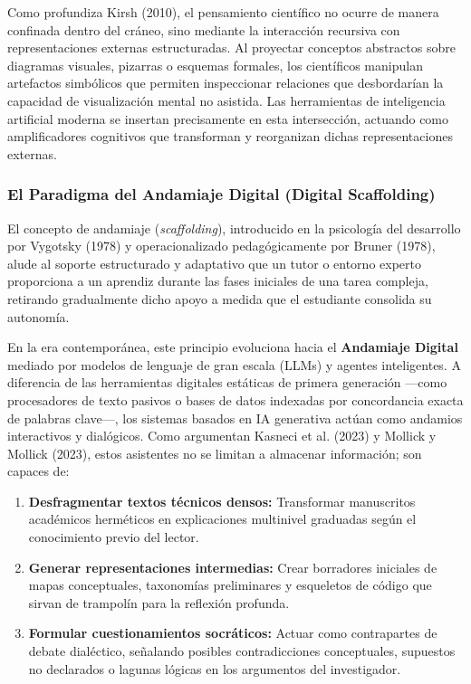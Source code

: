 Como profundiza Kirsh (2010), el pensamiento científico no ocurre de manera confinada dentro del cráneo, sino mediante la interacción recursiva con representaciones externas estructuradas. Al proyectar conceptos abstractos sobre diagramas visuales, pizarras o esquemas formales, los científicos manipulan artefactos simbólicos que permiten inspeccionar relaciones que desbordarían la capacidad de visualización mental no asistida. Las herramientas de inteligencia artificial moderna se insertan precisamente en esta intersección, actuando como amplificadores cognitivos que transforman y reorganizan dichas representaciones externas.

\subsubsection{El Paradigma del Andamiaje Digital (Digital Scaffolding)}

El concepto de andamiaje (\textit{scaffolding}), introducido en la psicología del desarrollo por Vygotsky (1978) y operacionalizado pedagógicamente por Bruner (1978), alude al soporte estructurado y adaptativo que un tutor o entorno experto proporciona a un aprendiz durante las fases iniciales de una tarea compleja, retirando gradualmente dicho apoyo a medida que el estudiante consolida su autonomía.

En la era contemporánea, este principio evoluciona hacia el \textbf{Andamiaje Digital} mediado por modelos de lenguaje de gran escala (LLMs) y agentes inteligentes. A diferencia de las herramientas digitales estáticas de primera generación ---como procesadores de texto pasivos o bases de datos indexadas por concordancia exacta de palabras clave---, los sistemas basados en IA generativa actúan como andamios interactivos y dialógicos. Como argumentan Kasneci et al. (2023) y Mollick y Mollick (2023), estos asistentes no se limitan a almacenar información; son capaces de:

\begin{enumerate}
    \item \textbf{Desfragmentar textos técnicos densos:} Transformar manuscritos académicos herméticos en explicaciones multinivel graduadas según el conocimiento previo del lector.
    \item \textbf{Generar representaciones intermedias:} Crear borradores iniciales de mapas conceptuales, taxonomías preliminares y esqueletos de código que sirvan de trampolín para la reflexión profunda.
    \item \textbf{Formular cuestionamientos socráticos:} Actuar como contrapartes de debate dialéctico, señalando posibles contradicciones conceptuales, supuestos no declarados o lagunas lógicas en los argumentos del investigador.
\end{enumerate}

